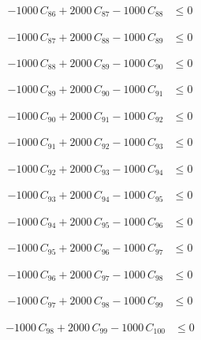 \documentclass[a4paper,11pt]{article}
\begin{document}
\begin{align}
-1000\,C_{86} + 2000\,C_{87} - 1000\,C_{88} &\leq 0 \nonumber
\end{align}

\begin{align}
-1000\,C_{87} + 2000\,C_{88} - 1000\,C_{89} &\leq 0 \nonumber
\end{align}

\begin{align}
-1000\,C_{88} + 2000\,C_{89} - 1000\,C_{90} &\leq 0 \nonumber
\end{align}

\begin{align}
-1000\,C_{89} + 2000\,C_{90} - 1000\,C_{91} &\leq 0 \nonumber
\end{align}

\begin{align}
-1000\,C_{90} + 2000\,C_{91} - 1000\,C_{92} &\leq 0 \nonumber
\end{align}

\begin{align}
-1000\,C_{91} + 2000\,C_{92} - 1000\,C_{93} &\leq 0 \nonumber
\end{align}

\begin{align}
-1000\,C_{92} + 2000\,C_{93} - 1000\,C_{94} &\leq 0 \nonumber
\end{align}

\begin{align}
-1000\,C_{93} + 2000\,C_{94} - 1000\,C_{95} &\leq 0 \nonumber
\end{align}

\begin{align}
-1000\,C_{94} + 2000\,C_{95} - 1000\,C_{96} &\leq 0 \nonumber
\end{align}

\begin{align}
-1000\,C_{95} + 2000\,C_{96} - 1000\,C_{97} &\leq 0 \nonumber
\end{align}

\begin{align}
-1000\,C_{96} + 2000\,C_{97} - 1000\,C_{98} &\leq 0 \nonumber
\end{align}

\begin{align}
-1000\,C_{97} + 2000\,C_{98} - 1000\,C_{99} &\leq 0 \nonumber
\end{align}

\begin{align}
-1000\,C_{98} + 2000\,C_{99} - 1000\,C_{100} &\leq 0 \nonumber
\end{align}
\end{document}
